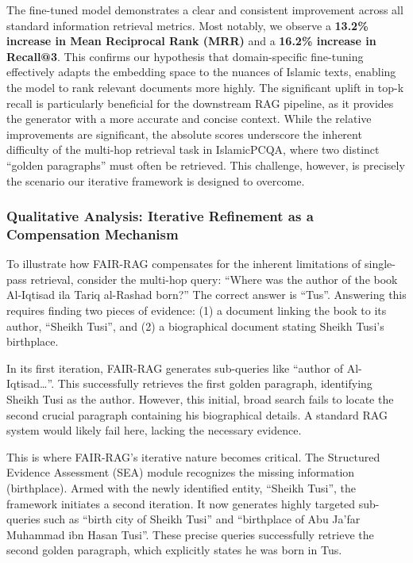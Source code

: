 \documentclass[11pt]{article}
\begin{document}
The fine-tuned model demonstrates a clear and consistent improvement across all standard information retrieval metrics. Most notably, we observe a \textbf{13.2\% increase in Mean Reciprocal Rank (MRR)} and a \textbf{16.2\% increase in Recall@3}. This confirms our hypothesis that domain-specific fine-tuning effectively adapts the embedding space to the nuances of Islamic texts, enabling the model to rank relevant documents more highly. The significant uplift in top-k recall is particularly beneficial for the downstream RAG pipeline, as it provides the generator with a more accurate and concise context. While the relative improvements are significant, the absolute scores underscore the inherent difficulty of the multi-hop retrieval task in IslamicPCQA, where two distinct ``golden paragraphs'' must often be retrieved. This challenge, however, is precisely the scenario our iterative framework is designed to overcome.

\subsubsection{Qualitative Analysis: Iterative Refinement as a Compensation Mechanism}

To illustrate how FAIR-RAG compensates for the inherent limitations of single-pass retrieval, consider the multi-hop query: ``Where was the author of the book Al-Iqtisad ila Tariq al-Rashad born?'' The correct answer is ``Tus''. Answering this requires finding two pieces of evidence: (1) a document linking the book to its author, ``Sheikh Tusi'', and (2) a biographical document stating Sheikh Tusi's birthplace.

In its first iteration, FAIR-RAG generates sub-queries like ``author of Al-Iqtisad\ldots''. This successfully retrieves the first golden paragraph, identifying Sheikh Tusi as the author. However, this initial, broad search fails to locate the second crucial paragraph containing his biographical details. A standard RAG system would likely fail here, lacking the necessary evidence.

This is where FAIR-RAG's iterative nature becomes critical. The Structured Evidence Assessment (SEA) module recognizes the missing information (birthplace). Armed with the newly identified entity, ``Sheikh Tusi'', the framework initiates a second iteration. It now generates highly targeted sub-queries such as ``birth city of Sheikh Tusi'' and ``birthplace of Abu Ja'far Muhammad ibn Hasan Tusi''. These precise queries successfully retrieve the second golden paragraph, which explicitly states he was born in Tus.
\end{document}

